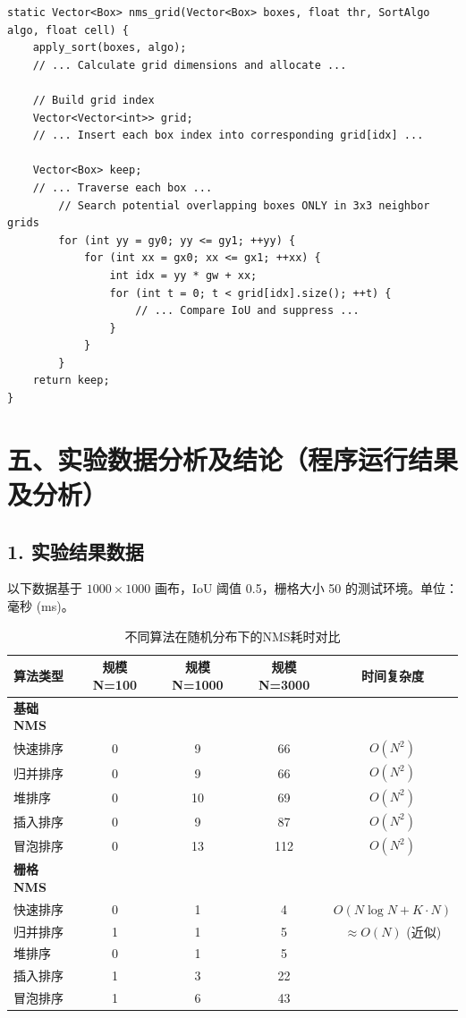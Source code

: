 \documentclass[a4paper,12pt]{ctexart}
\begin{document}
\begin{lstlisting}
static Vector<Box> nms_grid(Vector<Box> boxes, float thr, SortAlgo algo, float cell) {
    apply_sort(boxes, algo);
    // ... Calculate grid dimensions and allocate ...
    
    // Build grid index
    Vector<Vector<int>> grid;
    // ... Insert each box index into corresponding grid[idx] ...

    Vector<Box> keep;
    // ... Traverse each box ...
        // Search potential overlapping boxes ONLY in 3x3 neighbor grids
        for (int yy = gy0; yy <= gy1; ++yy) {
            for (int xx = gx0; xx <= gx1; ++xx) {
                int idx = yy * gw + xx;
                for (int t = 0; t < grid[idx].size(); ++t) {
                    // ... Compare IoU and suppress ...
                }
            }
        }
    return keep;
}
\end{lstlisting}

\section*{五、实验数据分析及结论（程序运行结果及分析）}

\subsection{1. 实验结果数据}

以下数据基于 $1000 \times 1000$ 画布，IoU 阈值 0.5，栅格大小 50 的测试环境。单位：毫秒 (ms)。

\begin{table}[H]
\centering
\caption{不同算法在随机分布下的NMS耗时对比}
\label{tab:random_dist}
\begin{tabular}{@{}lcccc@{}}
\toprule
\textbf{算法类型} & \textbf{规模 N=100} & \textbf{规模 N=1000} & \textbf{规模 N=3000} & \textbf{时间复杂度} \\ \midrule
\textbf{基础 NMS} & & & & \\
快速排序 & 0 & 9 & 66 & $O(N^2)$ \\
归并排序 & 0 & 9 & 66 & $O(N^2)$ \\
堆排序   & 0 & 10 & 69 & $O(N^2)$ \\
插入排序 & 0 & 9 & 87 & $O(N^2)$ \\
冒泡排序 & 0 & 13 & 112 & $O(N^2)$ \\ \midrule
\textbf{栅格 NMS} & & & & \\
快速排序 & 0 & 1 & 4 & $O(N \log N + K \cdot N)$ \\
归并排序 & 1 & 1 & 5 & $\approx O(N)$ (近似) \\
堆排序   & 0 & 1 & 5 & \\
插入排序 & 1 & 3 & 22 & \\
冒泡排序 & 1 & 6 & 43 & \\ \bottomrule
\end{tabular}
\end{table}
\end{document}

